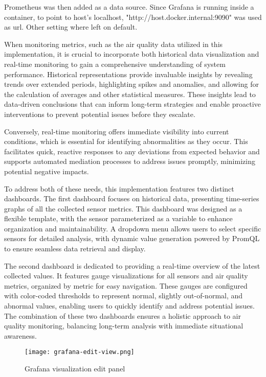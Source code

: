 Prometheus was then added as a data source. Since Grafana is running inside a container, to point to host's localhost, "http://host.docker.internal:9090" was used as url. Other setting where left on default.

When monitoring metrics, such as the air quality data utilized in this implementation, it is crucial to incorporate both historical data visualization and real-time monitoring to gain a comprehensive understanding of system performance. Historical representations provide invaluable insights by revealing trends over extended periods, highlighting spikes and anomalies, and allowing for the calculation of averages and other statistical measures. These insights lead to data-driven conclusions that can inform long-term strategies and enable proactive interventions to prevent potential issues before they escalate.

Conversely, real-time monitoring offers immediate visibility into current conditions, which is essential for identifying abnormalities as they occur. This facilitates quick, reactive responses to any deviations from expected behavior and supports automated mediation processes to address issues promptly, minimizing potential negative impacts.

To address both of these needs, this implementation features two distinct dashboards. The first dashboard focuses on historical data, presenting time-series graphs of all the collected sensor metrics. This dashboard was designed as a flexible template, with the sensor parameterized as a variable to enhance organization and maintainability. A dropdown menu allows users to select specific sensors for detailed analysis, with dynamic value generation powered by PromQL to ensure seamless data retrieval and display.

The second dashboard is dedicated to providing a real-time overview of the latest collected values. It features gauge visualizations for all sensors and air quality metrics, organized by metric for easy navigation. These gauges are configured with color-coded thresholds to represent normal, slightly out-of-normal, and abnormal values, enabling users to quickly identify and address potential issues. The combination of these two dashboards ensures a holistic approach to air quality monitoring, balancing long-term analysis with immediate situational awareness. 

\begin{figure}[!h]
    \graphicspath{ {./screenshots/} }
    \texttt{[image: grafana-edit-view.png]}
    \centering
    \caption{Grafana visualization edit panel}
    \label{fig:graf-edit-panel}
\end{figure}

